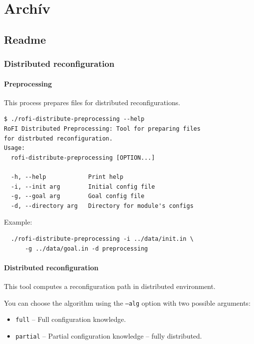\documentclass[
  printed, %
  oneside, %
  notable,   %
  nolof,     %
  nolot,     %
]{fithesis3}
\begin{document}
\chapter{Archív}

\section{Readme}
\label{sec:readme}
\subsection*{Distributed reconfiguration}
\subsubsection*{Preprocessing}

This process prepares files for distributed reconfigurations. 

\begin{verbatim}
$ ./rofi-distribute-preprocessing --help
RoFI Distributed Preprocessing: Tool for preparing files 
for distrbuted reconfiguration. 
Usage: 
  rofi-distribute-preprocessing [OPTION...]

  -h, --help            Print help
  -i, --init arg        Initial config file
  -g, --goal arg        Goal config file
  -d, --directory arg   Directory for module's configs
\end{verbatim}
Example: 

\begin{verbatim}
  ./rofi-distribute-preprocessing -i ../data/init.in \
      -g ../data/goal.in -d preprocessing
\end{verbatim}

\subsubsection*{Distributed reconfiguration}

This tool computes a reconfiguration path in distributed environment. 

You can choose the algorithm using the \texttt{--alg} option with two possible arguments:

\begin{itemize}
    \item \texttt{full} -- Full configuration knowledge.
    \item \texttt{partial} -- Partial configuration knowledge -- fully distributed. 
\end{itemize}
\end{document}
